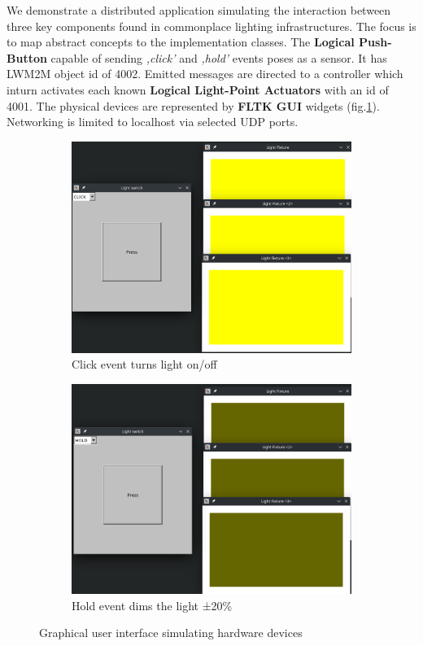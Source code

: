 \documentclass[11pt, english, a4paper, twoside]{article}
\begin{document}
We demonstrate a distributed application simulating the interaction between three key components found in commonplace lighting infrastructures. The focus is to map abstract concepts to the implementation classes. The \textbf{Logical Push-Button} capable of sending \emph{,click'} and \emph{,hold'} events poses as a sensor. It has LWM2M object id of 4002. Emitted messages are directed to a controller which inturn activates each known \textbf{Logical Light-Point Actuators} with an id of 4001. The physical devices are represented by \textbf{FLTK GUI} widgets (fig.\ref{fig:app-rust-gui}). Networking is limited to localhost via selected UDP ports. 

\begin{figure}[ht]
	\centering
	\begin{subfigure}[b]{0.45\textwidth}
		\includegraphics[width=\textwidth]{LightsOn.png}
		\caption{Click event turns light on/off}
	\end{subfigure}
    \hfill
    \begin{subfigure}[b]{0.45\textwidth}
		\includegraphics[width=\textwidth]{LightsDim.png}
		\caption{Hold event dims the light ±20\%}
	\end{subfigure}
	\caption{Graphical user interface simulating hardware devices}
	\label{fig:app-rust-gui}
\end{figure}
\end{document}

